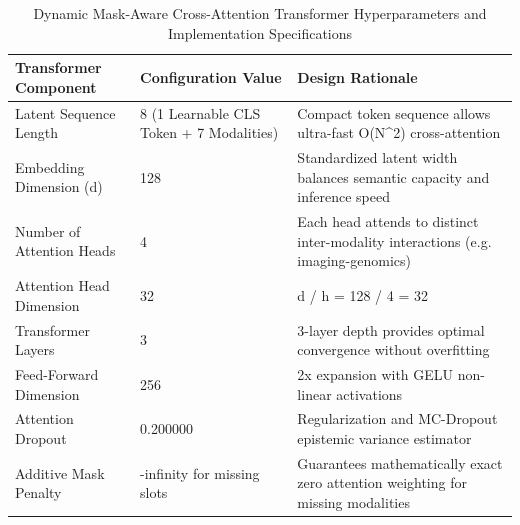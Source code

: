 \begin{table}
\caption{Dynamic Mask-Aware Cross-Attention Transformer Hyperparameters and Implementation Specifications}
\label{tab:supp_table_04_dynamic_mask_aware_cross_attention_hyperparameters}
\begin{tabular}{lll}
\toprule
Transformer Component & Configuration Value & Design Rationale \\
\midrule
Latent Sequence Length & 8 (1 Learnable CLS Token + 7 Modalities) & Compact token sequence allows ultra-fast O(N^2) cross-attention \\
Embedding Dimension (d) & 128 & Standardized latent width balances semantic capacity and inference speed \\
Number of Attention Heads & 4 & Each head attends to distinct inter-modality interactions (e.g. imaging-genomics) \\
Attention Head Dimension & 32 & d / h = 128 / 4 = 32 \\
Transformer Layers & 3 & 3-layer depth provides optimal convergence without overfitting \\
Feed-Forward Dimension & 256 & 2x expansion with GELU non-linear activations \\
Attention Dropout & 0.200000 & Regularization and MC-Dropout epistemic variance estimator \\
Additive Mask Penalty & -infinity for missing slots & Guarantees mathematically exact zero attention weighting for missing modalities \\
\bottomrule
\end{tabular}
\end{table}
